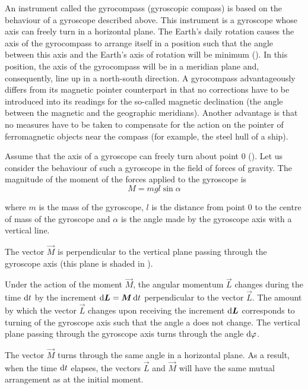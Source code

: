 An instrument called the gyrocompass (gyroscopic compass) is based on the behaviour of a gyroscope described above. This instrument is a gyroscope whose axis can freely turn in a horizontal plane. The Earth's daily rotation causes the axis of the gyrocompass to arrange itself in a position such that the angle between this axis and the Earth's axis of rotation will be minimum (). In this position, the axis of the gyrocompass will be in a meridian plane and, consequently, line up in a north-south direction. A gyrocompass advantageously differs from its magnetic pointer counterpart in that no corrections have to be introduced into its readings for the so-called magnetic declination (the angle between the magnetic and the geographic meridians). Another advantage is that no measures have to be taken to compensate for the action on the pointer of ferromagnetic objects near the compass (for example, the steel hull of a ship).

Assume that the axis of a gyroscope can freely turn about point $0$ (). Let us consider the behaviour of such a gyroscope in the field of forces of gravity. The magnitude of the moment of the forces applied to the gyroscope is
\begin{equation}\label{eq:5_71}
	M = mgl\sin\alpha
\end{equation}

\noindent
where $m$ is the mass of the gyroscope, $l$ is the distance from point $0$ to the centre of mass of the gyroscope and $\alpha$ is the angle made by the gyroscope axis with a vertical line.

The vector $\vec{M}$ is perpendicular to the vertical plane passing through the gyroscope axis (this plane is shaded in ).

Under the action of the moment $\vec{M}$, the angular momentum $\vec{L}$ changes during the time $\mathrm{d} t$ by the increment $\mathrm{d}\boldsymbol{L}=\boldsymbol{M}\,\mathrm{d} t$ perpendicular to the vector $\vec{L}$. The amount by which the vector $\vec{L}$ changes upon receiving the increment $\mathrm{d}\boldsymbol{L}$ corresponds to turning of the gyroscope axis such that the angle a does not change. The vertical plane passing through the gyroscope axis turns through the angle $\mathrm{d}\varphi$.

The vector $\vec{M}$ turns through the same angle in a horizontal plane. As a result, when the time $\mathrm{d} t$ elapses, the vectors $\vec{L}$ and $\vec{M}$ will have the same mutual arrangement as at the initial moment.

